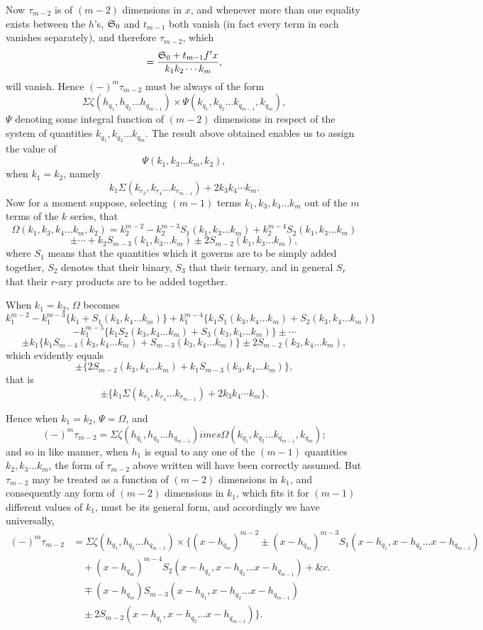 \documentclass[11pt]{article}
\newcommand{\sourcepage}[1]{\marginpar{\scriptsize p.~#1}}
\begin{document}
Now $\tau_{m-2}$ is of $(m-2)$ dimensions in $x$, and whenever more than one equality exists between the $h$'s, $\mathfrak{S}_0$ and $t_{m-1}$ both vanish (in fact every term in each vanishes separately), and therefore $\tau_{m-2}$, which
\[
=\frac{\mathfrak{S}_0+t_{m-1}f'x}{k_1k_2\cdots k_m},
\]
will vanish. Hence $(-)^m\tau_{m-2}$ must be always of the form
\[
\Sigma\zeta(h_{q_1},h_{q_2}\ldots h_{q_{m-1}})\times
\Psi(k_{q_1},k_{q_2}\ldots k_{q_{m-1}},k_{q_m}),
\]
$\Psi$ denoting some integral function of $(m-2)$ dimensions in respect of the system of quantities $k_{q_1},k_{q_2}\ldots k_{q_m}$. The result above obtained enables us to assign the value of
\[
\Psi(k_1,k_3\ldots k_m,k_2),
\]
when $k_1=k_2$, namely
\[
k_1\Sigma(k_{r_3},k_{r_4}\ldots k_{r_{m-1}})+2k_3k_4\cdots k_m.
\]
Now for a moment suppose, selecting $(m-1)$ terms $k_1,k_3,k_4\ldots k_m$ out of the $m$ terms of the $k$ series, that
\[
\Omega(k_1,k_3,k_4\ldots k_m,k_2)=k_2^{m-2}-k_2^{m-3}S_1(k_1,k_3\ldots k_m)+k_2^{m-4}S_2(k_1,k_3\ldots k_m)
\]
\[
\pm\cdots+k_2S_{m-3}(k_1,k_3\ldots k_m)\pm2S_{m-2}(k_1,k_3\ldots k_m),
\]
where $S_1$ means that the quantities which it governs are to be simply added together, $S_2$ denotes that their binary, $S_3$ that their ternary, and in general $S_r$ that their $r$-ary products are to be added together.

When $k_1=k_2$, $\Omega$ becomes
\[
k_1^{m-2}-k_1^{m-3}\{k_1+S_1(k_3,k_4\ldots k_m)\}+k_1^{m-4}\{k_1S_1(k_3,k_4\ldots k_m)+S_2(k_3,k_4\ldots k_m)\}
\]
\[
-k_1^{m-5}\{k_1S_2(k_3,k_4\ldots k_m)+S_3(k_3,k_4\ldots k_m)\}\pm\cdots
\]
\[
\pm k_1\{k_1S_{m-4}(k_3,k_4\ldots k_m)+S_{m-3}(k_3,k_4\ldots k_m)\}
\pm2S_{m-2}(k_3,k_4\ldots k_m),
\]
which evidently equals
\[
\pm\{2S_{m-2}(k_3,k_4\ldots k_m)+k_1S_{m-3}(k_3,k_4\ldots k_m)\},
\]
that is
\[
\pm\{k_1\Sigma(k_{r_3},k_{r_4}\ldots k_{r_{m-1}})+2k_3k_4\cdots k_m\}.
\]

\sourcepage{489}
Hence when $k_1=k_2$, $\Psi=\Omega$, and
\[
(-)^m\tau_{m-2}=\Sigma\zeta(h_{q_1},h_{q_2}\ldots h_{q_{m-1}})	imes
\Omega(k_{q_1},k_{q_2}\ldots k_{q_{m-1}},k_{q_m});
\]
and so in like manner, when $h_1$ is equal to any one of the $(m-1)$ quantities $k_2,k_3\ldots k_m$, the form of $\tau_{m-2}$ above written will have been correctly assumed. But $\tau_{m-2}$ may be treated as a function of $(m-2)$ dimensions in $k_1$, and consequently any form of $(m-2)$ dimensions in $k_1$, which fits it for $(m-1)$ different values of $k_1$, must be its general form, and accordingly we have universally,
\[
\begin{aligned}
(-)^m\tau_{m-2}&=\Sigma\zeta(h_{q_1},h_{q_2}\ldots h_{q_{m-1}})\times\{(x-h_{q_m})^{m-2}\pm(x-h_{q_m})^{m-3}S_1(x-h_{q_1},x-h_{q_2}\ldots x-h_{q_{m-1}})\\
&\quad +(x-h_{q_m})^{m-4}S_2(x-h_{q_1},x-h_{q_2}\ldots x-h_{q_{m-1}})+\&c.\\
&\quad \mp(x-h_{q_m})S_{m-3}(x-h_{q_1},x-h_{q_2}\ldots x-h_{q_{m-1}})\\
&\quad \pm2S_{m-2}(x-h_{q_1},x-h_{q_2}\ldots x-h_{q_{m-1}})\}.
\end{aligned}
\]
\end{document}
